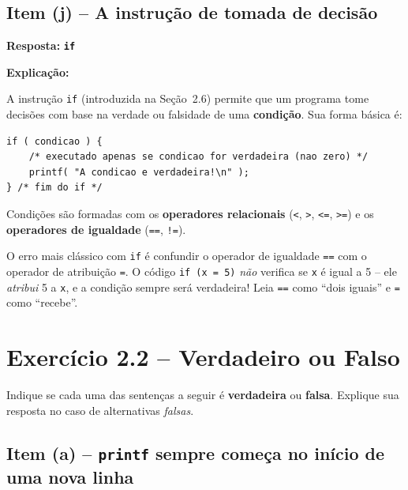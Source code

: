 \documentclass[12pt,a4paper]{article}
\begin{document}
\subsection*{Item (j) -- A instrução de tomada de decisão}

\begin{respostabox}
\textbf{Resposta:} \textcolor{deitelblue}{\textbf{\texttt{if}}}

\medskip\textbf{Explicação:}

A instrução \texttt{if} (introduzida na Seção~2.6) permite que um programa tome decisões
com base na verdade ou falsidade de uma \textbf{condição}. Sua forma básica é:

\begin{lstlisting}
if ( condicao ) {
    /* executado apenas se condicao for verdadeira (nao zero) */
    printf( "A condicao e verdadeira!\n" );
} /* fim do if */
\end{lstlisting}

Condições são formadas com os \textbf{operadores relacionais} (\texttt{<}, \texttt{>},
\texttt{<=}, \texttt{>=}) e os \textbf{operadores de igualdade} (\texttt{==}, \texttt{!=}).

\begin{erroco}
  O erro mais clássico com \texttt{if} é confundir o operador de igualdade
  \texttt{==} com o operador de atribuição \texttt{=}. O código
  \texttt{if (x = 5)} \textit{não} verifica se \texttt{x} é igual a 5 --
  ele \textit{atribui} 5 a \texttt{x}, e a condição sempre será verdadeira!
  Leia \texttt{==} como ``dois iguais'' e \texttt{=} como ``recebe''.
\end{erroco}
\end{respostabox}

\newpage

\section{Exercício 2.2 -- Verdadeiro ou Falso}

\begin{enunciadoBox}[Enunciado]
Indique se cada uma das sentenças a seguir é \textbf{verdadeira} ou \textbf{falsa}.
Explique sua resposta no caso de alternativas \textit{falsas}.
\end{enunciadoBox}

\subsection*{Item (a) -- \texttt{printf} sempre começa no início de uma nova linha}
\end{document}
